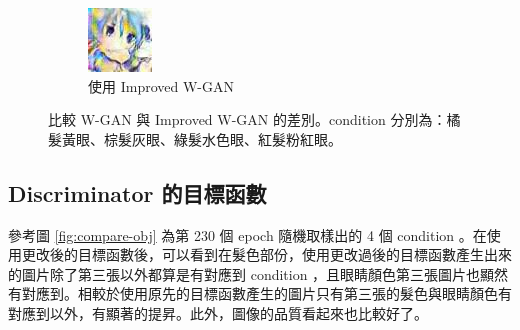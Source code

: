 \documentclass[fleqn,a4paper,12pt]{article}
\begin{document}
\begin{figure}[H]
\begin{subfigure}{0.45\textwidth}
  \includegraphics[width=0.2\linewidth]{imgs/iwgan-230-original-loss/5-3-0.jpg}
  \caption{使用 Improved W-GAN}
\end{subfigure}
\caption{比較 W-GAN 與 Improved W-GAN 的差別。condition 分別為：橘髮黃眼、棕髮灰眼、綠髮水色眼、紅髮粉紅眼。}
\label{fig:compare-wgan-iwgan}
\end{figure}


\subsection{Discriminator 的目標函數}

參考圖 \ref{fig:compare-obj} 為第 230 個 epoch 隨機取樣出的 4 個 condition 。在使用更改後的目標函數後，可以看到在髮色部份，使用更改過後的目標函數產生出來的圖片除了第三張以外都算是有對應到 condition ，且眼睛顏色第三張圖片也顯然有對應到。相較於使用原先的目標函數產生的圖片只有第三張的髮色與眼睛顏色有對應到以外，有顯著的提昇。此外，圖像的品質看起來也比較好了。
\end{document}
